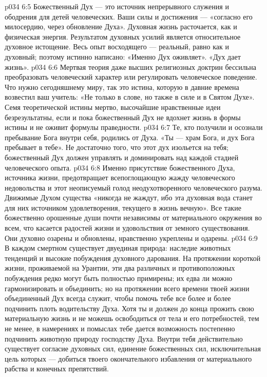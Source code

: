 \vs p034 6:5 \pc Божественный Дух --- это источник непрерывного служения и ободрения для детей человеческих. Ваши силы и достижения --- «согласно его милосердию, через обновление Духа». Духовная жизнь расточается, как и физическая энергия. Результатом духовных усилий является относительное духовное истощение. Весь опыт восходящего --- реальный, равно как и духовный; поэтому истинно написано: «Именно Дух оживляет». «Дух дает жизнь».
\vs p034 6:6 Мертвая теория даже высших религиозных доктрин бессильна преобразовать человеческий характер или регулировать человеческое поведение. Что нужно сегодняшнему миру, так это истина, которую в давние времена возвестил ваш учитель: «Не только в слове, но также в силе и в Святом Духе». Семя теоретической истины мертво, высочайшие нравственные идеи безрезультатны, если и пока божественный Дух не вдохнет жизнь в формы истины и не оживит формулы праведности.
\vs p034 6:7 Те, кто получили и осознали пребывание Бога внутри себя, родились от Духа. «Ты --- храм Бога, и дух Бога пребывает в тебе». Не достаточно того, что этот дух изольется на тебя; божественный Дух должен управлять и доминировать над каждой стадией человеческого опыта.
\vs p034 6:8 Именно присутствие божественного Духа, источника жизни, предотвращает всепоглощающую жажду человеческого недовольства и этот неописуемый голод неодухотворенного человеческого разума. Движимые Духом существа «никогда не жаждут, ибо эта духовная вода станет для них источником удовлетворения, текущего в жизнь вечную». Все такие божественно орошенные души почти независимы от материального окружения во всем, что касается радостей жизни и удовольствия от земного существования. Они духовно озарены и обновлены, нравственно укреплены и одарены.
\vs p034 6:9 \pc В каждом смертном существует двуединая природа: наследие животных тенденций и высокие побуждения духовного дарования. На протяжении короткой жизни, проживаемой на Урантии, эти два различных и противоположных побуждения редко могут быть полностью примирены; их едва ли можно гармонизировать и объединить; но на протяжении всего времени твоей жизни объединенный Дух всегда служит, чтобы помочь тебе все более и более подчинить плоть водительству Духа. Хотя ты и должен до конца прожить свою материальную жизнь и не можешь освободиться от тела и его потребностей, тем не менее, в намерениях и помыслах тебе дается возможность постепенно подчинить животную природу господству Духа. Внутри тебя действительно существует согласие духовных сил, единение божественных сил, исключительная цель которых --- добиться твоего окончательного избавления от материального рабства и конечных препятствий.
